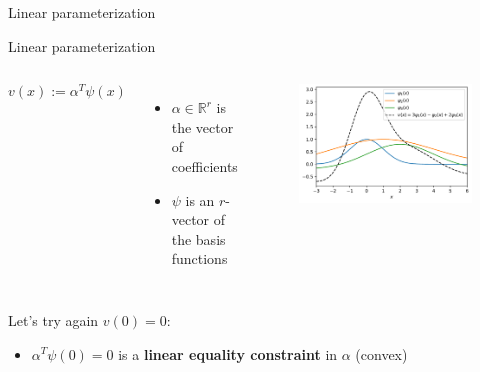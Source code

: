 \documentclass[aspectratio=169]{beamer}
\begin{document}
\begin{frame}{Linear parameterization}
\begin{block}{Linear parameterization}
\begin{columns}
$$
v(x) := \alpha^T \psi(x)
$$
\begin{itemize}
\item
$\alpha \in \mathbb R^r$ is the vector of coefficients
\item
$\psi$ is an $r$-vector of the basis functions
\end{itemize}
\begin{figure}
\includegraphics[width=\columnwidth]{figures/linear_parameterization.pdf}
\end{figure}
\end{columns}
\end{block}
\pause
Let's try again $v(0) = 0$:
\begin{itemize}
\item
$\alpha^T \psi(0) = 0$ is a \textbf{linear equality constraint} in $\alpha$ (convex)
\end{itemize}
\end{frame}
\end{document}
